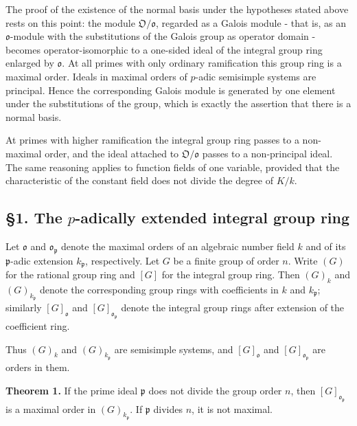 \documentclass[11pt]{article}
\begin{document}
The proof of the existence of the normal basis under the hypotheses
stated above rests on this point: the module
\(\mathfrak O/\mathfrak o\), regarded as a Galois module - that is, as
an \(\mathfrak o\)-module with the substitutions of the Galois group as
operator domain - becomes operator-isomorphic to a one-sided ideal of
the integral group ring enlarged by \(\mathfrak o\). At all primes with
only ordinary ramification this group ring is a maximal order. Ideals in
maximal orders of \(p\)-adic semisimple systems are principal. Hence the
corresponding Galois module is generated by one element under the
substitutions of the group, which is exactly the assertion that there is
a normal basis.

At primes with higher ramification the integral group ring passes to a
non-maximal order, and the ideal attached to \(\mathfrak O/\mathfrak o\)
passes to a non-principal ideal. The same reasoning applies to function
fields of one variable, provided that the characteristic of the constant
field does not divide the degree of \(K/k\).

\subsection{\texorpdfstring{§1. The \(p\)-adically extended integral
group
ring}{§1. The p-adically extended integral group ring}}\label{the-p-adically-extended-integral-group-ring}

Let \(\mathfrak o\) and \(\mathfrak o_{\mathfrak p}\) denote the maximal
orders of an algebraic number field \(k\) and of its
\(\mathfrak p\)-adic extension \(k_{\mathfrak p}\), respectively. Let
\(G\) be a finite group of order \(n\). Write \((G)\) for the rational
group ring and \([G]\) for the integral group ring. Then \((G)_k\) and
\((G)_{k_{\mathfrak p}}\) denote the corresponding group rings with
coefficients in \(k\) and \(k_{\mathfrak p}\); similarly
\([G]_{\mathfrak o}\) and \([G]_{\mathfrak o_{\mathfrak p}}\) denote the
integral group rings after extension of the coefficient ring.

Thus \((G)_k\) and \((G)_{k_{\mathfrak p}}\) are semisimple systems, and
\([G]_{\mathfrak o}\) and \([G]_{\mathfrak o_{\mathfrak p}}\) are orders
in them.

\textbf{Theorem 1.} If the prime ideal \(\mathfrak p\) does not divide
the group order \(n\), then \([G]_{\mathfrak o_{\mathfrak p}}\) is a
maximal order in \((G)_{k_{\mathfrak p}}\). If \(\mathfrak p\) divides
\(n\), it is not maximal.
\end{document}
